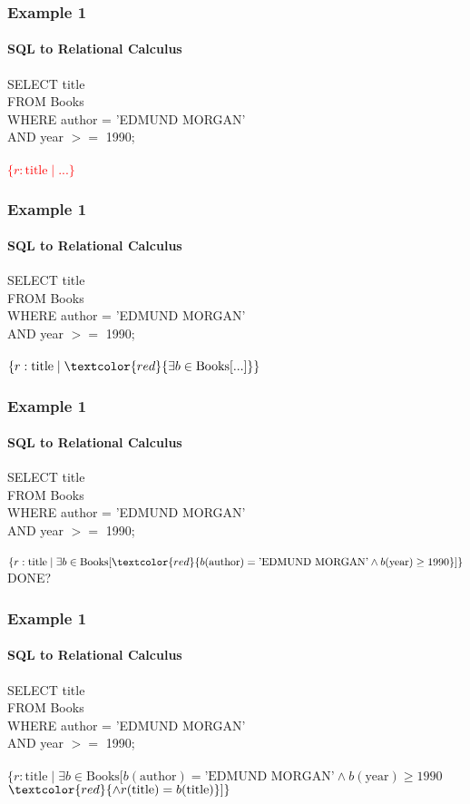 \documentclass{beamer}
\begin{document}
\begin{frame}
  \frametitle{Example 1}
    \framesubtitle{SQL to Relational Calculus}
  SELECT title\\
  FROM Books\\
  WHERE author = 'EDMUND MORGAN'\\
  AND year $>=$ 1990;\\
  \hfill \\
  \textcolor{red}{$\{r:\text{title} \mid ... \}$}
\end{frame}

\begin{frame}
  \frametitle{Example 1}
    \framesubtitle{SQL to Relational Calculus}
  SELECT title\\
  FROM Books\\
  WHERE author = 'EDMUND MORGAN'\\
  AND year $>=$ 1990;\\
  \hfill \\
  $\{r:\text{title} \mid \textcolor{red}{\exists b \in \text{Books} [ ... ]} \}$
\end{frame}

\begin{frame}
  \frametitle{Example 1}
    \framesubtitle{SQL to Relational Calculus}
  SELECT title\\
  FROM Books\\
  WHERE author = 'EDMUND MORGAN'\\
  AND year $>=$ 1990;\\
  \hfill \\
  $\{r:\text{title} \mid \exists b \in \text{Books} [ \textcolor{red}{b(\text{author}) = \text{'EDMUND MORGAN'} \land b(\text{year}) \geq 1990} ] \}$\\
  DONE?
\end{frame}

\begin{frame}
  \frametitle{Example 1}
    \framesubtitle{SQL to Relational Calculus}
  SELECT title\\
  FROM Books\\
  WHERE author = 'EDMUND MORGAN'\\
  AND year $>=$ 1990;\\
  \hfill \\
  $\{r:\text{title} \mid \exists b \in \text{Books} [ b(\text{author}) = \text{'EDMUND MORGAN'} \land b(\text{year}) \geq 1990$\\
  $\textcolor{red}{\land r(\text{title}) = b(\text{title})}] \}$\\
\end{frame}
\end{document}
